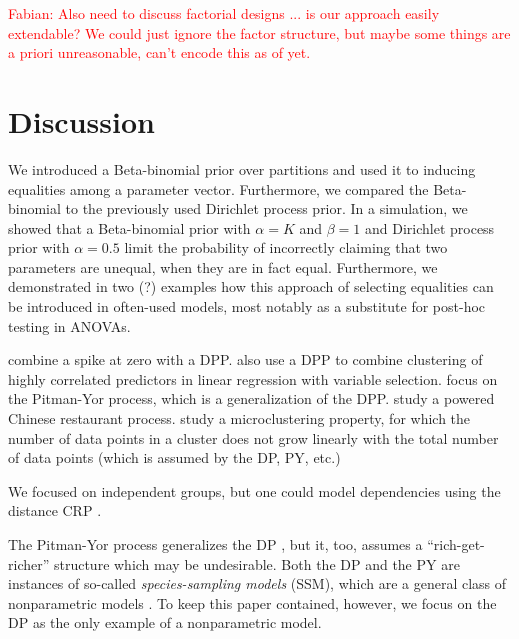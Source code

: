 \documentclass[11pt,a4paper]{article}
\theoremstyle{definition} %
\theoremstyle{case}
\newcommand{\FD}[1]{\textcolor{red}{Fabian: #1 }}
\begin{document}

\FD{Also need to discuss factorial designs ... is our approach easily extendable? We could just ignore the factor structure, but maybe some things are a priori unreasonable, can't encode this as of yet.}

\section{Discussion} \label{sec:discussion}
We introduced a Beta-binomial prior over partitions and used it to inducing equalities among a parameter vector. Furthermore, we compared the Beta-binomial to the previously used Dirichlet process prior. In a simulation, we showed that a Beta-binomial prior with $\alpha=K$ and $\beta = 1$ and Dirichlet process prior with $\alpha = 0.5$ limit the probability of incorrectly claiming that two parameters are unequal, when they are in fact equal. Furthermore, we demonstrated in two (?) examples how this approach of selecting equalities can be introduced in often-used models, most notably as a substitute for post-hoc testing in ANOVAs.

\textcite{kim2009spiked} combine a spike at zero with a DPP. \textcite{curtis2011bayesian} also use a DPP to combine clustering of highly correlated predictors in linear regression with variable selection. \textcite{canale2017pitman} focus on the Pitman-Yor process, which is a generalization of the DPP. \textcite{lu2018reducing} study a powered Chinese restaurant process. \textcite{miller2015microclustering} study a microclustering property, for which the number of data points in a cluster does not grow linearly with the total number of data points (which is assumed by the DP, PY, etc.)

We focused on independent groups, but one could model dependencies using the distance CRP \parencite{blei2011distance}.

The Pitman-Yor process generalizes the DP \parencite{pitman1997two}, but it, too, assumes a ``rich-get-richer'' structure which may be undesirable. Both the DP and the PY are instances of so-called \textit{species-sampling models} (SSM), which are a general class of nonparametric models \parencite[e.g.,][]{lee2013defining, ishwaran2003generalized, pitman1996some}. To keep this paper contained, however, we focus on the DP as the only example of a nonparametric model.
\end{document}
